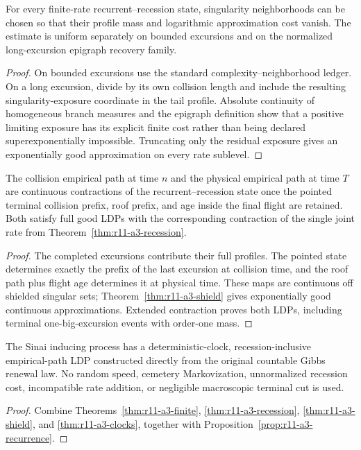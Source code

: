 \begin{theorem}
\label{thm:r11-a3-shield}
For every finite-rate recurrent--recession state, singularity neighborhoods
can be chosen so that their profile mass and logarithmic approximation cost
vanish.  The estimate is uniform separately on bounded excursions and on the
normalized long-excursion epigraph recovery family.
\end{theorem}

\begin{proof}
On bounded excursions use the standard complexity--neighborhood ledger.  On a
long excursion, divide by its own collision length and include the resulting
singularity-exposure coordinate in the tail profile.  Absolute continuity of
homogeneous branch measures and the epigraph definition show that a positive
limiting exposure has its explicit finite cost rather than being declared
superexponentially impossible.  Truncating only the residual exposure gives an
exponentially good approximation on every rate sublevel.
\end{proof}

\begin{theorem}
\label{thm:r11-a3-clocks}
The collision empirical path at time $n$ and the physical empirical path at
time $T$ are continuous contractions of the recurrent--recession state once
the pointed terminal collision prefix, roof prefix, and age inside the final
flight are retained.  Both satisfy full good LDPs with the corresponding
contraction of the single joint rate from
Theorem~\ref{thm:r11-a3-recession}.
\end{theorem}

\begin{proof}
The completed excursions contribute their full profiles.  The pointed state
determines exactly the prefix of the last excursion at collision time, and the
roof path plus flight age determines it at physical time.  These maps are
continuous off shielded singular sets; Theorem~\ref{thm:r11-a3-shield} gives
exponentially good continuous approximations.  Extended contraction proves
both LDPs, including terminal one-big-excursion events with order-one mass.
\end{proof}

\begin{theorem}
\label{thm:r11-a3-main}
The Sinai inducing process has a deterministic-clock, recession-inclusive
empirical-path LDP constructed directly from the original countable Gibbs
renewal law.  No random speed, cemetery Markovization, unnormalized recession
cost, incompatible rate addition, or negligible macroscopic terminal cut is
used.
\end{theorem}

\begin{proof}
Combine Theorems~\ref{thm:r11-a3-finite},
\ref{thm:r11-a3-recession}, \ref{thm:r11-a3-shield}, and
\ref{thm:r11-a3-clocks}, together with
Proposition~\ref{prop:r11-a3-recurrence}.
\end{proof}
